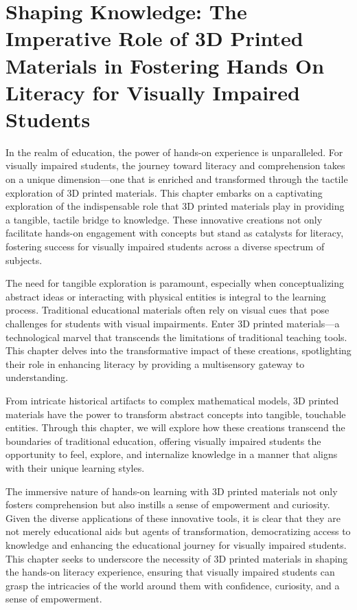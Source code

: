 \documentclass[14pt,letterpaper,twoside]{extreport}
\begin{document}
\pagebreak \hypertarget{d-printers}{%
	\chapter[Shaping Knowledge: The Imperative Role of 3D Printed Materials in Fostering Hands On Literacy for Visually Impaired Students]{Shaping Knowledge: The Imperative Role of 3D Printed Materials in Fostering Hands On Literacy for Visually Impaired Students}\label{d-printers}}
In the realm of education, the power of hands-on experience is unparalleled. For visually impaired students, the journey toward literacy and comprehension takes on a unique dimension—one that is enriched and transformed through the tactile exploration of 3D printed materials. This chapter embarks on a captivating exploration of the indispensable role that 3D printed materials play in providing a tangible, tactile bridge to knowledge. These innovative creations not only facilitate hands-on engagement with concepts but stand as catalysts for literacy, fostering success for visually impaired students across a diverse spectrum of subjects.

The need for tangible exploration is paramount, especially when conceptualizing abstract ideas or interacting with physical entities is integral to the learning process. Traditional educational materials often rely on visual cues that pose challenges for students with visual impairments. Enter 3D printed materials—a technological marvel that transcends the limitations of traditional teaching tools. This chapter delves into the transformative impact of these creations, spotlighting their role in enhancing literacy by providing a multisensory gateway to understanding.

From intricate historical artifacts to complex mathematical models, 3D printed materials have the power to transform abstract concepts into tangible, touchable entities. Through this chapter, we will explore how these creations transcend the boundaries of traditional education, offering visually impaired students the opportunity to feel, explore, and internalize knowledge in a manner that aligns with their unique learning styles.

The immersive nature of hands-on learning with 3D printed materials not only fosters comprehension but also instills a sense of empowerment and curiosity. Given the diverse applications of these innovative tools, it is clear that they are not merely educational aids but agents of transformation, democratizing access to knowledge and enhancing the educational journey for visually impaired students. This chapter seeks to underscore the necessity of 3D printed materials in shaping the hands-on literacy experience, ensuring that visually impaired students can grasp the intricacies of the world around them with confidence, curiosity, and a sense of empowerment.
\end{document}
